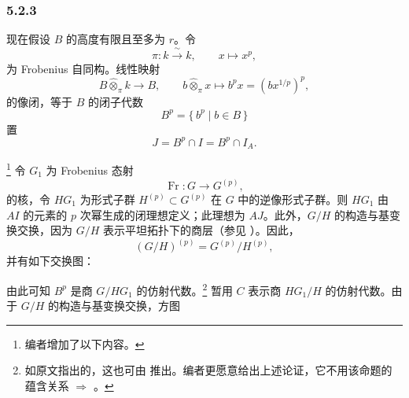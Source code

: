 
\subsubsection*{5.2.3}
\label{sga3:VIIB:5.2.3}

现在假设 \(B\) 的高度有限且至多为 \(r\)。令
\[
  \pi:k\xrightarrow{\ \sim\ }k,
  \qquad
  x\longmapsto x^p,
\]
为 Frobenius 自同构。线性映射
\[
  B\widehat\otimes_{\pi}k\longrightarrow B,
  \qquad
  b\widehat\otimes_{\pi}x
  \longmapsto
  b^px=(bx^{1/p})^p,
\]
的像闭，等于 \(B\) 的闭子代数
\[
  B^p=\{\,b^p\mid b\in B\,\}
\]
置
\[
  J=B^p\cap I=B^p\cap I_A.
\]

\footnote{\label{sga3:VIIB:nde:158}编者增加了以下内容。}
令 \(G_1\) 为 Frobenius 态射
\[
  \operatorname{Fr}:G\longrightarrow G^{(p)},
\]
的核，令 \(HG_1\) 为形式子群 \(H^{(p)}\subset G^{(p)}\) 在 \(G\) 中的逆像形式子群。则 \(HG_1\) 由 \(AI\) 的元素的 \(p\) 次幂生成的闭理想定义；此理想为 \(AJ\)。此外，\(G/H\) 的构造与基变换交换，因为 \(G/H\) 表示平坦拓扑下的商层\textup{（参见 ）}。因此，
\[
  (G/H)^{(p)}=G^{(p)}/H^{(p)},
\]
并有如下交换图：

\begin{figure}[H]
  \centering
  
\end{figure}

由此可知 \(B^p\) 是商 \(G/HG_1\) 的仿射代数。\footnote{\label{sga3:VIIB:nde:159}如原文指出的，这也可由  推出。编者更愿意给出上述论证，它不用该命题的蕴含关系 \textup{} \(\Rightarrow\) \textup{}。}
暂用 \(C\) 表示商 \(HG_1/H\) 的仿射代数。由于 \(G/H\) 的构造与基变换交换，方图

\begin{figure}[H]
  \centering
  
\end{figure}

